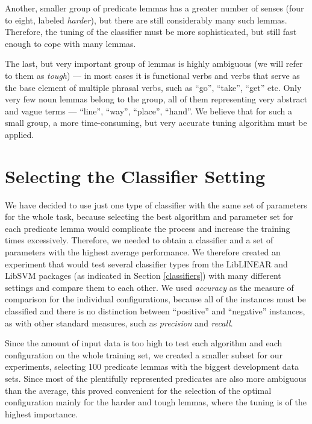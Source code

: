 \documentclass[12pt,notitlepage]{report}
\begin{document}
Another, smaller group of predicate lemmas has a greater number of senses (four to eight, labeled \emph{harder}), but there are still considerably many such lemmas. Therefore, the tuning of the classifier must be more sophisticated, but still fast enough to cope with many lemmas.

The last, but very important group of lemmas is highly ambiguous (we will refer to them as \emph{tough}) --- in most cases it is functional verbs and verbs that serve as the base element of multiple phrasal verbs, such as ``go'', ``take'', ``get'' etc. Only very few noun lemmas belong to the group, all of them representing very abstract and vague terms --- ``line'', ``way'', ``place'', ``hand''. We believe that for such a small group, a more time-consuming, but very accurate tuning algorithm must be applied.

\section{Selecting the Classifier Setting}\label{classifier-setting}

We have decided to use just one type of classifier with the same set of parameters for the whole task, because selecting the best algorithm and parameter set for each predicate lemma would complicate the process and increase the training times excessively. Therefore, we needed to obtain a classifier and a set of parameters with the highest average performance. We therefore created an experiment that would test several classifier types from the LibLINEAR and LibSVM packages (as indicated in Section \ref{classifiers}) with many different settings and compare them to each other. We used \emph{accuracy} \citep[a percentage of correctly classified senses][p. 269]{manning00} as the measure of comparison for the individual configurations, because all of the instances must be classified and there is no distinction between ``positive'' and ``negative'' instances, as with other standard measures, such as \emph{precision} and \emph{recall}.

Since the amount of input data is too high to test each algorithm and each configuration on the whole training set, we created a smaller subset for our experiments, selecting 100 predicate lemmas with the biggest development data sets. Since most of the plentifully represented predicates are also more ambiguous than the average, this proved convenient for the selection of the optimal configuration mainly for the harder and tough lemmas, where the tuning is of the highest importance.
\end{document}
